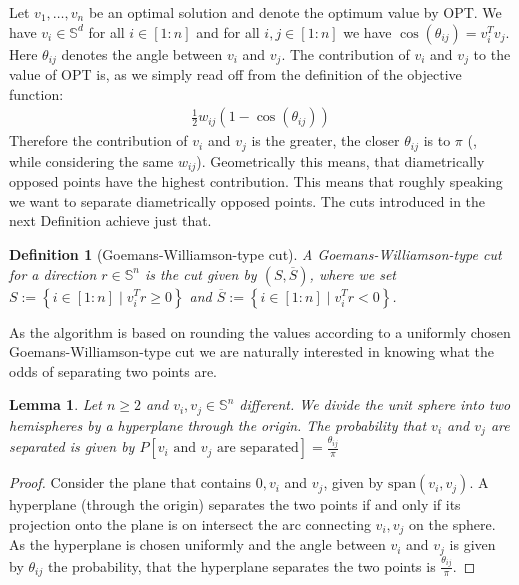 \documentclass[12pt,a4paper]{article}
\theoremstyle{mythm}
\newtheorem{Def}[thm]{Definition}
\newtheorem{lem}[thm]{Lemma}
\begin{document}
Let $ v_1 , \dots , v_n $ be an optimal solution and denote the optimum value by OPT.
We have $ v_i \in \mathbb{S} ^{ d }  $ for all $ i \in \left[ 1:n \right]  $ and 
for all $ i,j \in \left[ 1:n \right]  $ we have $ \cos( \theta _{ ij }  ) = v_i ^T v_j $. 
Here $ \theta _{ ij }  $ denotes the angle between $ v_i $ and $ v_j $.
The contribution of $ v_i $ and $ v_j $ to the value of OPT is, as we simply read off from the definition of the objective function:
\begin{align*}
\frac{ 1 }{ 2 } w _{ ij } \left( 1 - \cos( \theta _{ ij }  )  \right) 
\end{align*} 
Therefore the contribution of $ v_i $ and $ v_j $ is the greater, the closer $ \theta _{ ij }  $ is to $ \pi  $ (, while considering the same $ w _{ ij }  $). 
Geometrically this means, that diametrically opposed points have the highest contribution.
This means that roughly speaking we want to separate diametrically opposed points.
The cuts introduced in the next Definition achieve just that.
\begin{Def}[Goemans-Williamson-type cut] 
A Goemans-Williamson-type cut for a direction $ r \in \mathbb{S} ^{ n }  $ is the cut given by 
$ \left( S , \overline{ S }  \right)  $, where we set $ S := \left\{ i \in \left[ 1:n \right]  \mid  v_i ^T r \geq 0  \right\}  $ and 
$ \overline{ S }  := \left\{ i \in \left[ 1:n \right] \mid  v_i ^T r < 0  \right\} $.
\end{Def} 
As the algorithm is based on rounding the values according to a uniformly chosen Goemans-Williamson-type cut we are naturally interested in knowing what the odds of separating
two points are.
\begin{lem}
\label{lem:angle} 
Let $ n \geq 2  $ and $ v_i , v_j \in \mathbb{S} ^{ n } $ different. We divide the unit sphere into two hemispheres by a hyperplane through the origin.
The probability that $ v_i $ and $ v_j $ are separated is given by $ P \left[ v_i \text{ and } v_j \text{ are separated}  \right] = \frac{ \theta _{ ij }  }{ \pi }   $
\end{lem} 
\begin{proof}
Consider the plane that contains $ 0,v_i $ and $ v_j $, given by $ \text{span} \left( v_i, v_j \right) $.
A hyperplane (through the origin) separates the two points if and only if its projection onto the plane is on intersect the arc connecting $ v_i, v_j $ on the sphere.
As the hyperplane is chosen uniformly and the angle between $ v_i $ and $ v_j $ is given by $ \theta _{ ij }  $ the probability, that the hyperplane separates the two points is $ \frac{ \theta _{ ij }  }{ \pi }  $.
\end{proof}
\end{document}
